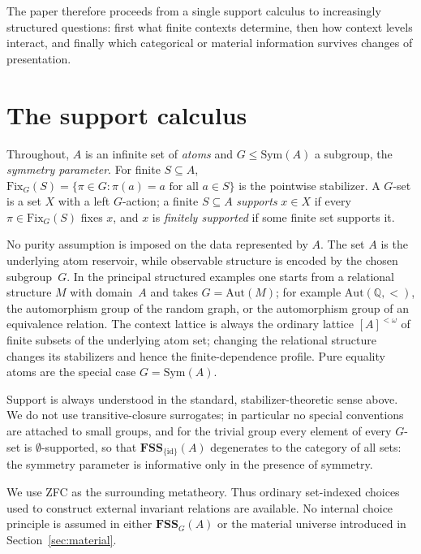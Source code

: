 \documentclass{lmcs}
\newcommand{\Sym}{\mathrm{Sym}}
\newcommand{\Fix}{\mathrm{Fix}}
\newcommand{\Aut}{\mathrm{Aut}}
\newcommand{\FSS}{\mathbf{FSS}}
\begin{document}
The paper therefore proceeds from a single support calculus to increasingly structured questions: first what finite contexts determine, then how context levels interact, and finally which categorical or material information survives changes of presentation.

\section{The support calculus} \label{sec:prelim}

Throughout, $A$ is an infinite set of \emph{atoms} and $G\leq\Sym(A)$ a subgroup, the \emph{symmetry parameter}. For finite $S\subseteq A$, $\Fix_G(S)=\{\pi\in G:\pi(a)=a\text{ for all }a\in S\}$ is the pointwise stabilizer. A $G$-set is a set $X$ with a left $G$-action; a finite $S\subseteq A$ \emph{supports} $x\in X$ if every
$\pi\in\Fix_G(S)$ fixes $x$, and $x$ is \emph{finitely supported} if some finite set supports it.

No purity assumption is imposed on the data represented by $A$. The set
$A$ is the underlying atom reservoir, while observable structure is encoded
by the chosen subgroup~$G$. In the principal structured examples one starts
from a relational structure $M$ with domain~$A$ and takes
$G=\Aut(M)$; for example $\Aut(\mathbb Q,<)$, the automorphism group of the
random graph, or the automorphism group of an equivalence relation. The
context lattice is always the ordinary lattice $[A]^{<\omega}$ of finite
subsets of the underlying atom set; changing the relational structure changes its stabilizers and hence the finite-dependence profile. Pure equality atoms are the special case $G=\Sym(A)$.

\begin{conv}\label{conv:standard}
Support is always understood in the standard, stabilizer-theoretic sense above. We do not use transitive-closure surrogates; in particular no special conventions are attached to small groups, and for the trivial group every element of every $G$-set is $\emptyset$-supported, so that $\FSS_{\{\mathrm{id}\}}(A)$ degenerates to the category of all sets: the symmetry parameter is informative only in the presence of symmetry.
\end{conv}

\noindent
We use ZFC as the surrounding metatheory. Thus ordinary set-indexed
choices used to construct external invariant relations are available.
No internal choice principle is assumed in either $\FSS_G(A)$ or the
material universe introduced in Section~\ref{sec:material}.
\end{document}
